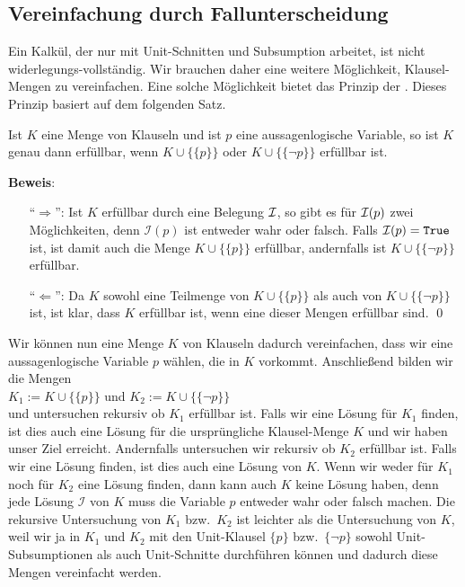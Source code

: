 \subsection{Vereinfachung durch Fallunterscheidung}
Ein Kalkül, der nur mit Unit-Schnitten und Subsumption arbeitet, ist nicht 
widerlegungs-vollständig.  Wir brauchen 
daher eine weitere Möglichkeit, Klausel-Mengen zu vereinfachen.
Eine solche Möglichkeit bietet das Prinzip der
.  Dieses Prinzip basiert auf dem folgenden
Satz.

\begin{Satz}
  Ist $K$ eine Menge von Klauseln und ist $p$ eine aussagenlogische Variable, 
  so ist $K$ genau dann erfüllbar, wenn $K \cup \bigl\{\{p\}\bigr\}$ oder 
  $K \cup \bigl\{\{\neg p\}\bigr\}$ erfüllbar ist.  
\end{Satz}

\noindent
\textbf{Beweis}:
\begin{enumerate}
\item[``$\Rightarrow$'':] 
  Ist $K$ erfüllbar durch eine Belegung $\mathcal{I}$, so gibt es für  $\mathcal{I}(p)$ zwei Möglichkeiten, denn 
  $\mathcal{I}(p)$ ist entweder wahr oder falsch.  Falls $\mathcal{I}(p) = \texttt{True}$ ist, ist damit auch die Menge $K \cup
  \bigl\{\{p\}\bigr\}$ erfüllbar,
  andernfalls ist $K \cup \bigl\{\{\neg p\}\bigr\}$
  erfüllbar. 
\item[``$\Leftarrow$'':] 
  Da $K$ sowohl eine Teilmenge von $K \cup \bigl\{\{p\}\bigr\}$ als auch von 
  $K \cup \bigl\{\{\neg p\}\bigr\}$ ist, ist klar, dass $K$ erfüllbar
  ist, wenn eine dieser Mengen erfüllbar sind.  
\qed
\end{enumerate}

Wir können nun eine Menge $K$ von Klauseln dadurch vereinfachen, dass wir eine
aussagenlogische Variable $p$ wählen, die in $K$ vorkommt.
Anschließend bilden wir die Mengen \\[0.2cm]
\hspace*{1.3cm} $K_1 := K \cup \bigl\{\{p\}\bigr\}$ \quad und \quad $K_2 := K \cup
\bigl\{\{\neg p\}\bigr\}$
\\[0.2cm]
und untersuchen rekursiv ob $K_1$ erfüllbar ist.  Falls wir eine Lösung für $K_1$ finden,
ist dies auch eine Lösung für die ursprüngliche Klausel-Menge $K$ und wir haben unser Ziel
erreicht.
Andernfalls untersuchen wir rekursiv ob $K_2$ erfüllbar ist.
Falls wir eine Lösung finden, ist dies auch eine Lösung von $K$.  Wenn wir weder
für $K_1$ noch für $K_2$ eine Lösung finden, dann kann auch $K$ keine Lösung haben,
denn jede Lösung $\mathcal{I}$ von $K$ muss die Variable $p$ entweder wahr oder falsch machen.
Die rekursive Untersuchung von $K_1$ bzw.~$K_2$ ist leichter als die Untersuchung von $K$,
weil wir ja in $K_1$ und $K_2$ mit den Unit-Klausel $\{p\}$ bzw.~$\{\neg p\}$
sowohl Unit-Subsumptionen als auch Unit-Schnitte durchführen können und dadurch diese Mengen vereinfacht
werden. 


